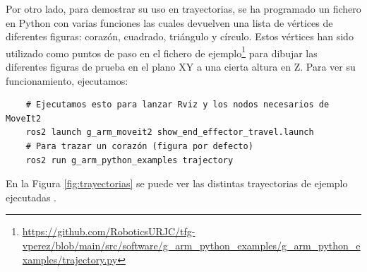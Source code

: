 Por otro lado, para demostrar su uso en trayectorias, se ha programado un fichero en Python con varias funciones las cuales devuelven una lista de vértices de diferentes 
figuras: corazón, cuadrado, triángulo y círculo. Estos vértices han sido utilizado como puntos de paso en el fichero de 
ejemplo\footnote{\url{https://github.com/RoboticsURJC/tfg-vperez/blob/main/src/software/g\_arm\_python_examples/g\_arm_python\_examples/trajectory.py}} para 
dibujar las diferentes figuras de prueba en el plano XY a una cierta altura en Z. Para ver su funcionamiento, ejecutamos:
\begin{verbatim}
    # Ejecutamos esto para lanzar Rviz y los nodos necesarios de MoveIt2
    ros2 launch g_arm_moveit2 show_end_effector_travel.launch 
    # Para trazar un corazón (figura por defecto)
    ros2 run g_arm_python_examples trajectory
\end{verbatim}

En la Figura \ref{fig:trayectorias} se puede ver las distintas trayectorias de ejemplo ejecutadas .


